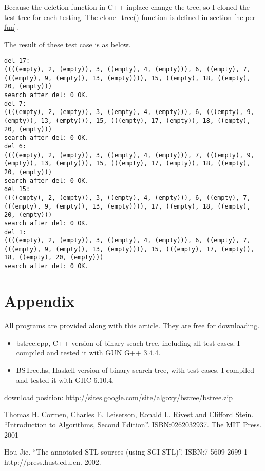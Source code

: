 \documentclass{article}
\begin{document}
Because the deletion function in C++ inplace change the tree, so I cloned the test 
tree for each testing. The clone\_tree() function is defined in section \ref{helper-fun}.

The result of these test case is as below.
\begin{verbatim}
del 17:
((((empty), 2, (empty)), 3, ((empty), 4, (empty))), 6, ((empty), 7, 
(((empty), 9, (empty)), 13, (empty)))), 15, ((empty), 18, ((empty), 
20, (empty)))
search after del: 0 OK.
del 7:
((((empty), 2, (empty)), 3, ((empty), 4, (empty))), 6, (((empty), 9, 
(empty)), 13, (empty))), 15, (((empty), 17, (empty)), 18, ((empty), 
20, (empty)))
search after del: 0 OK.
del 6:
((((empty), 2, (empty)), 3, ((empty), 4, (empty))), 7, (((empty), 9, 
(empty)), 13, (empty))), 15, (((empty), 17, (empty)), 18, ((empty), 
20, (empty)))
search after del: 0 OK.
del 15:
((((empty), 2, (empty)), 3, ((empty), 4, (empty))), 6, ((empty), 7, 
(((empty), 9, (empty)), 13, (empty)))), 17, ((empty), 18, ((empty), 
20, (empty)))
search after del: 0 OK.
del 1:
((((empty), 2, (empty)), 3, ((empty), 4, (empty))), 6, ((empty), 7, 
(((empty), 9, (empty)), 13, (empty)))), 15, (((empty), 17, (empty)), 
18, ((empty), 20, (empty)))
search after del: 0 OK.
\end{verbatim}

\section{Appendix} \label{appendix}
All programs are provided along with this article. They are free for downloading.
\begin{itemize}
\item bstree.cpp, C++ version of binary seach tree, including all test cases. I 
compiled and tested it with GUN G++ 3.4.4.
\item BSTree.hs, Haskell version of binary search tree, with test cases. I compiled
and tested it with GHC 6.10.4.
\end{itemize}
download position: http://sites.google.com/site/algoxy/bstree/bstree.zip

\begin{thebibliography}{99}

Thomas H. Cormen, Charles E. Leiserson, Ronald L. Rivest and Clifford Stein. 
``Introduction to Algorithms, Second Edition''. ISBN:0262032937. The MIT Press. 2001

Hou Jie. ``The annotated STL sources (using SGI STL)''. ISBN:7-5609-2699-1 http://press.hust.edu.cn. 2002.


\end{thebibliography}

\ifx\wholebook\relax\else
\end{document}
